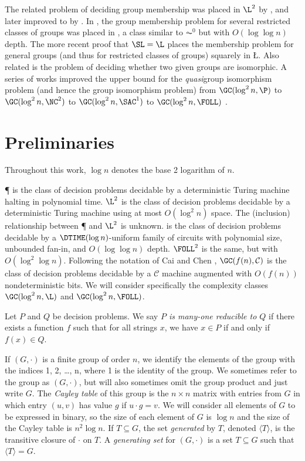 \documentclass{article}
\newcommand{\gen}[1]{{\langle #1 \rangle}}
\begin{document}
The related problem of deciding group membership was placed in $\L^2$ by \cite{lsz77}, and later improved to \SL{} by \cite{bm89}.
In \cite{bklm01}, the group membership problem for several restricted classes of groups was placed in \FOLL, a class similar to $\AC^0$ but with $O(\log \log n)$ depth.
The more recent proof that $\SL = \L$ \cite{reingold08} places the membership problem for general groups (and thus for restricted classes of groups) squarely in \L.
Also related is the problem of deciding whether two given groups are isomorphic.
A series of works improved the upper bound for the \emph{quasi}group isomorphism problem (and hence the group isomorphism problem) from $\GC(\log^2 n, \P)$ \cite{py96} to $\GC(\log^2 n, \NC^2)$ \cite{wolf94} to $\GC(\log^2 n, \SAC^1)$ \cite{wagner10} to $\GC(\log^2 n, \FOLL)$ \cite{ctw10}.

\section{Preliminaries}\label{sec:prelim}

Throughout this work, $\log n$ denotes the base 2 logarithm of $n$.

\P{} is the class of decision problems decidable by a deterministic Turing machine halting in polynomial time.
$\L^2$ is the class of decision problems decidable by a deterministic Turing machine using at most $O(\log^2 n)$ space.
The (inclusion) relationship between \P{} and $\L^2$ is unknown.
\FOLL{} is the class of decision problems decidable by a $\DTIME(\log n)$-uniform family of circuits with polynomial size, unbounded fan-in, and $O(\log \log n)$ depth.
$\FOLL^2$ is the same, but with $O(\log^2 \log n)$.
Following the notation of Cai and Chen \cite{cc97}, $\GC(f(n), \mathcal{C})$ is the class of decision problems decidable by a $\mathcal{C}$ machine augmented with $O(f(n))$ nondeterministic bits.
We will consider specifically the complexity classes $\GC(\log^2 n, \L)$ and $\GC(\log^2 n, \FOLL)$.

Let $P$ and $Q$ be decision problems.
We say \emph{$P$ is many-one reducible to $Q$} if there exists a function $f$ such that for all strings $x$, we have $x \in P$ if and only if $f(x) \in Q$.

If $(G, \cdot)$ is a finite group of order $n$, we identify the elements of the group with the indices 1, 2, \ldots, n, where 1 is the identity of the group.
We sometimes refer to the group as $(G, \cdot)$, but will also sometimes omit the group product and just write $G$.
The \emph{Cayley table} of this group is the $n \times n$ matrix with entries from $G$ in which entry $(u, v)$ has value $g$ if $u \cdot g = v$.
We will consider all elements of $G$ to be expressed in binary, so the size of each element of $G$ is $\log n$ and the size of the Cayley table is $n^2 \log n$.
If $T \subseteq G$, the set \emph{generated} by $T$, denoted $\gen{T}$, is the transitive closure of $\cdot$ on $T$.
A \emph{generating set} for $(G, \cdot)$ is a set $T \subseteq G$ such that $\gen{T} = G$.
\end{document}
